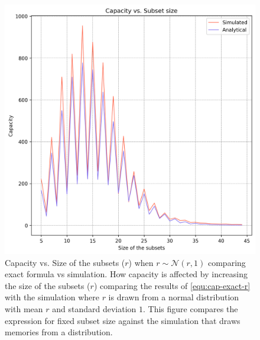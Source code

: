     \begin{figure}%
        \centering
        \includegraphics[scale=0.83]{figures/cap-vs-r-bounded-exact-1.png}
        \caption[Capacity vs. Size of the subsets ($r$) when $r \sim \mathcal{N}(r,1)$ comparing exact formula vs simulation]{Capacity vs. Size of the subsets ($r$) when $r \sim \mathcal{N}(r,1)$ comparing exact formula vs simulation. \textmd{How capacity is affected by increasing the size of the subsets ($r$) comparing the results of \ref{equ:cap-exact-r} with the simulation where $r$ is drawn from a normal distribution with mean $r$ and standard deviation $1$. This figure compares the expression for fixed subset size against the simulation that draws memories from a distribution.}}
        \label{figure:cap-vs-r-bounded-exact-1}
        \end{figure}

